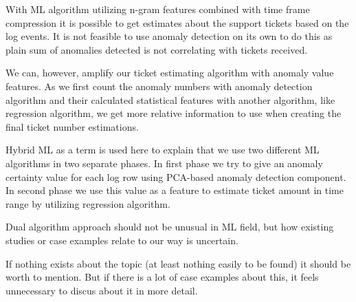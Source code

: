 With ML algorithm utilizing n-gram features combined with time frame compression
it is possible to get estimates
about the support tickets based on the log events.
It is not feasible to use anomaly detection on its own to do this
as plain sum of anomalies detected
is not correlating with tickets received.

We can, however,
amplify our ticket estimating algorithm with anomaly value features.
As we first count the anomaly numbers with anomaly detection algorithm %
and their calculated statistical features with another algorithm,
like regression algorithm,
we get more relative information to use
when creating the final ticket number estimations. %



\begin{itcomment}
    Hybrid ML as a term is used here to explain that we
    use two different ML algorithms in two separate phases.
    In first phase we try to give an anomaly certainty value for each log row
    using PCA-based anomaly detection component.
    In second phase we use this value as a feature to estimate ticket amount in time range
    by utilizing regression algorithm.

    Dual algorithm approach should not be unusual in ML field,
    but how existing studies or case examples relate to our way is uncertain.

    If nothing exists about the topic (at least nothing easily to be found)
    it should be worth to mention.
    But if there is a lot of case examples about this, it feels unnecessary
    to discus about it in more detail.
\end{itcomment}


\clearpage